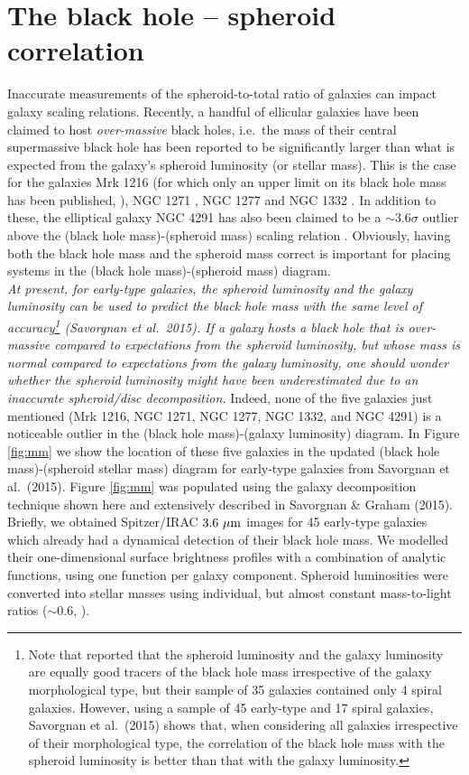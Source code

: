 \documentclass[useAMS,usenatbib,article]{mnras}
\begin{document}
\section{The black hole -- spheroid correlation}
\label{sec:mm}
Inaccurate measurements of the spheroid-to-total ratio of galaxies can impact galaxy scaling relations. 
Recently, a handful of ellicular galaxies have been claimed to host \emph{over-massive} black holes, 
i.e.~the mass of their central supermassive black hole has been reported to be significantly larger 
than what is expected from the galaxy's spheroid luminosity (or stellar mass).
This is the case for the galaxies Mrk 1216 (for which only an upper limit on its black hole mass has been published, 
\citealt{yildirim2015}), NGC 1271 \citep{walsh2015}, 
NGC 1277 \citep{vandenbosch2012,yildirim2015} and NGC 1332 \citep{rusli2011}.
In addition to these, the elliptical galaxy NGC 4291 has also been claimed to be a $\sim$$3.6\sigma$ outlier 
above the (black hole mass)-(spheroid mass) scaling relation \citep{bogdan2012}. 
Obviously, having both the black hole mass and the spheroid mass correct is important 
for placing systems in the (black hole mass)-(spheroid mass) diagram. \\
\emph{At present, for early-type galaxies, the spheroid luminosity and the galaxy luminosity 
can be used to predict the black hole mass with the same level of accuracy\footnote{Note that 
\cite{lasker2014anal} reported that the spheroid luminosity and the galaxy luminosity are equally good tracers of the black hole mass 
irrespective of the galaxy morphological type, but their sample of 35 galaxies contained only 4 spiral galaxies. 
However, using a sample of 45 early-type and 17 spiral galaxies, 
Savorgnan et al.~(2015) shows that, when considering all galaxies irrespective of their morphological type, 
the correlation of the black hole mass with the spheroid luminosity is better than that with the galaxy luminosity.} 
(Savorgnan et al.~2015). 
If a galaxy hosts a black hole that is over-massive compared to expectations from the spheroid luminosity, 
but whose mass is normal compared to expectations from the galaxy luminosity, 
one should wonder whether the spheroid luminosity might have been underestimated 
due to an inaccurate spheroid/disc decomposition. }
Indeed, none of the five galaxies just mentioned (Mrk 1216, NGC 1271, NGC 1277, NGC 1332, and NGC 4291) is a noticeable outlier 
in the (black hole mass)-(galaxy luminosity) diagram. 
In Figure \ref{fig:mm} we show the location of these five galaxies in the updated (black hole mass)-(spheroid stellar mass) diagram 
for early-type galaxies from Savorgnan et al.~(2015). 
Figure \ref{fig:mm} was populated using the galaxy decomposition technique shown here 
and extensively described in Savorgnan \& Graham (2015). 
Briefly, we obtained Spitzer/IRAC $3.6~\rm \mu m$ images for 45 early-type galaxies 
which already had a dynamical detection of their black hole mass. 
We modelled their one-dimensional surface brightness profiles with a combination of analytic functions, 
using one function per galaxy component. 
Spheroid luminosities were converted into stellar masses using individual, 
but almost constant mass-to-light ratios ($\sim$$0.6$, \citealt{meidt2014}). \\
\end{document}
